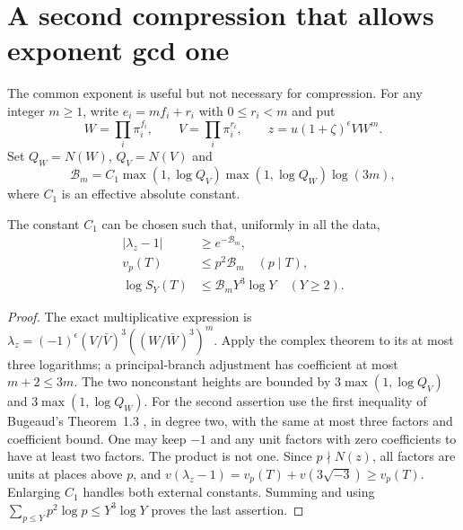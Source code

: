 \section{A second compression that allows exponent gcd one}
\label{sec:xc-cluster}
The common exponent is useful but not necessary for compression. For any
integer $m\ge1$, write $e_i=mf_i+r_i$ with $0\le r_i<m$ and put
\[
 W=\prod_i\pi_i^{f_i},\qquad V=\prod_i\pi_i^{r_i},\qquad
 z=u(1+\zeta)^\epsilon VW^m.
\]
Set $Q_W=N(W)$, $Q_V=N(V)$ and
\[
 \mathcal B_m=C_1\max(1,\log Q_V)\max(1,\log Q_W)\log(3m),
\]
where $C_1$ is an effective absolute constant.
\begin{proposition}\label{prop:xc-two-block}
The constant $C_1$ can be chosen such that, uniformly in all the data,
\begin{align}
 |\lambda_z-1|&\ge e^{-\mathcal B_m},\label{eq:xc-block-angle}\\
 v_p(T)&\le p^2\mathcal B_m\quad(p\mid T),\label{eq:xc-block-local}\\
 \log S_Y(T)&\le\mathcal B_mY^3\log Y\quad(Y\ge2).
 \label{eq:xc-block-small}
\end{align}
\end{proposition}
\begin{proof}
The exact multiplicative expression is
$\lambda_z=(-1)^\epsilon(V/\bar V)^3((W/\bar W)^3)^m$.
Apply the complex theorem to its at most three logarithms; a principal-branch
adjustment has coefficient at most $m+2\le3m$.
The two nonconstant heights are bounded by
$3\max(1,\log Q_V)$ and $3\max(1,\log Q_W)$.
For the second assertion use the first inequality of Bugeaud's
Theorem~1.3 \cite{moving:bugeaud}, in degree two, with the same at most three
factors and coefficient bound. One may keep $-1$ and any unit factors with
zero coefficients to have at least two factors. The product is not one.
Since $p\nmid N(z)$, all factors are units at places above $p$, and
$v(\lambda_z-1)=v_p(T)+v(3\sqrt{-3})\ge v_p(T)$.
Enlarging $C_1$ handles both external constants. Summing and using
$\sum_{p\le Y}p^2\log p\le Y^3\log Y$ proves the last assertion.
\end{proof}

